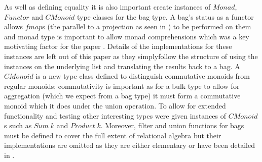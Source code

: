 As well as defining equality it is also important create instances of $Monad$,
$Functor$ and $CMonoid$ type classes for the bag type. A bag's status as a functor allows $fmap$s
(the parallel to a projection as seen in ) to be performed on
them and monad type is important to allow monad comprehensions which was a key
motivating factor for the paper \relalg{}. Details of the implementations for these instances are
left out of this paper as they simplyfollow the structure of using the instances on
the underlying list and translating the results back to a bag. A $CMonoid$ is a new type class
defined to distinguish commutative monoids from regular monoids; commutativity
is important as for a bulk type to allow for aggregation (which we expect from a
bag type) it must form a commutative monoid which it does under the union
operation. To allow for extended functionality and testing other interesting
types were given instances of $CMonoid$s such as $Sum\;k$ and $Product\;k$. Moreover, filter
and union functions for bags must be defined to cover the full extent of
relational algebra but their implementations are omitted as they are either
elementary or have been detailed in \relalg{}.
